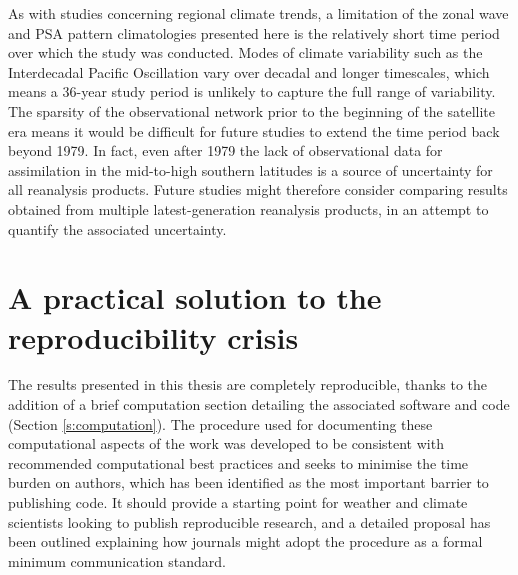 As with studies concerning regional climate trends, a limitation of the zonal wave and PSA pattern climatologies presented here is the relatively short time period over which the study was conducted. Modes of climate variability such as the Interdecadal Pacific Oscillation \citep{Power1999} vary over decadal and longer timescales, which means a 36-year study period is unlikely to capture the full range of variability. The sparsity of the observational network prior to the beginning of the satellite era means it would be difficult for future studies to extend the time period back beyond 1979. In fact, even after 1979 the lack of observational data for assimilation in the mid-to-high southern latitudes is a source of uncertainty for all reanalysis products. Future studies might therefore consider comparing results obtained from multiple latest-generation reanalysis products, in an attempt to quantify the associated uncertainty. 


\section{A practical solution to the reproducibility crisis}

The results presented in this thesis are completely reproducible, thanks to the addition of a brief computation section detailing the associated software and code (Section \ref{s:computation}). The procedure used for documenting these computational aspects of the work was developed to be consistent with recommended computational best practices and seeks to minimise the time burden on authors, which has been identified as the most important barrier to publishing code. It should provide a starting point for weather and climate scientists looking to publish reproducible research, and a detailed proposal has been outlined explaining how journals might adopt the procedure as a formal minimum communication standard.

